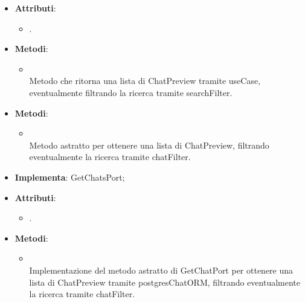 \documentclass[10pt, a4paper]{article}
\begin{document}
\label{GetChatsControllerDettaglio}
\begin{itemize}
    \item \textbf{Attributi}:
    \begin{itemize}
        \item {}.
    \end{itemize}
    \item \textbf{Metodi}:
    \begin{itemize}
        \item {}\\
        Metodo che ritorna una lista di ChatPreview tramite useCase, eventualmente filtrando la ricerca tramite searchFilter. 
    \end{itemize}
\end{itemize}

\label{GetChatsPortDettaglio}
\begin{itemize}
    \item \textbf{Metodi}:
    \begin{itemize}
        \item {}\\
        Metodo astratto per ottenere una lista di ChatPreview, filtrando eventualmente la ricerca tramite chatFilter.
    \end{itemize}
\end{itemize}

\label{GetChatsPostgresDettaglio}
\begin{itemize}
    \item \textbf{Implementa}: GetChatsPort;
    \item \textbf{Attributi}:
    \begin{itemize}
        \item {}.
    \end{itemize}
    \item \textbf{Metodi}:
    \begin{itemize}
        \item {}\\
        Implementazione del metodo astratto di GetChatPort per ottenere una lista di ChatPreview tramite postgresChatORM, filtrando eventualmente la ricerca tramite chatFilter.
        
    \end{itemize}
\end{itemize}
\end{document}
